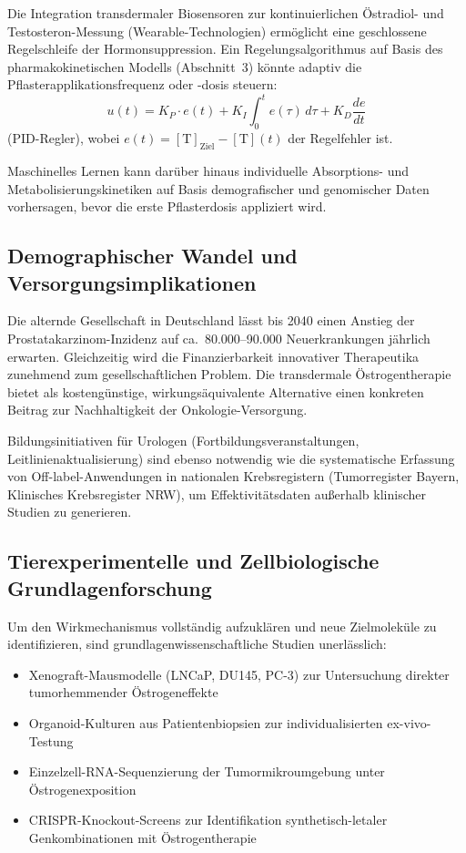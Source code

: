 ﻿\documentclass[a4paper,12pt]{article}
\theoremstyle{definition}
\begin{document}
Die Integration transdermaler Biosensoren zur kontinuierlichen Östradiol- und Testosteron-Messung (Wearable-Technologien) ermöglicht eine geschlossene Regelschleife der Hormonsuppression.
Ein Regelungsalgorithmus auf Basis des pharmakokinetischen Modells (Abschnitt~3) könnte adaptiv die Pflasterapplikationsfrequenz oder -dosis steuern:
\begin{equation}
  u(t) = K_P \cdot e(t) + K_I \int_0^t e(\tau)\,d\tau + K_D \frac{de}{dt}
\end{equation}
(PID-Regler), wobei $e(t) = [\mathrm{T}]_{\mathrm{Ziel}} - [\mathrm{T}](t)$ der Regelfehler ist.

Maschinelles Lernen kann darüber hinaus individuelle Absorptions- und Metabolisierungskinetiken auf Basis demografischer und genomischer Daten vorhersagen, bevor die erste Pflasterdosis appliziert wird.

\subsection{Demographischer Wandel und Versorgungsimplikationen}

Die alternde Gesellschaft in Deutschland lässt bis 2040 einen Anstieg der Prostatakarzinom-Inzidenz auf ca.\ 80.000--90.000 Neuerkrankungen jährlich erwarten.
Gleichzeitig wird die Finanzierbarkeit innovativer Therapeutika zunehmend zum gesellschaftlichen Problem.
Die transdermale Östrogentherapie bietet als kostengünstige, wirkungsäquivalente Alternative einen konkreten Beitrag zur Nachhaltigkeit der Onkologie-Versorgung.

Bildungsinitiativen für Urologen (Fortbildungsveranstaltungen, Leitlinienaktualisierung) sind ebenso notwendig wie die systematische Erfassung von Off-label-Anwendungen in nationalen Krebsregistern (Tumorregister Bayern, Klinisches Krebsregister NRW), um Effektivitätsdaten außerhalb klinischer Studien zu generieren.

\subsection{Tierexperimentelle und Zellbiologische Grundlagenforschung}

Um den Wirkmechanismus vollständig aufzuklären und neue Zielmoleküle zu identifizieren, sind grundlagenwissenschaftliche Studien unerlässlich:
\begin{itemize}
  \item Xenograft-Mausmodelle (LNCaP, DU145, PC-3) zur Untersuchung direkter tumorhemmender Östrogeneffekte
  \item Organoid-Kulturen aus Patientenbiopsien zur individualisierten ex-vivo-Testung
  \item Einzelzell-RNA-Sequenzierung der Tumormikroumgebung unter Östrogenexposition
  \item CRISPR-Knockout-Screens zur Identifikation synthetisch-letaler Genkombinationen mit Östrogentherapie
\end{itemize}
\end{document}
